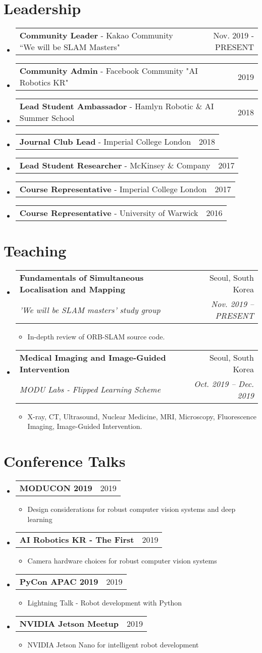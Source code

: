\documentclass[letterpaper,11pt]{article}
\makeatletter
\newcommand{\resumeItem}[1]{
  \item\small{
    {#1 \vspace{-2pt}}
  }
}
\newcommand{\resumeSubheading}[4]{
  \vspace{-1pt}\item
    \begin{tabular*}{0.97\textwidth}[t]{l@{\extracolsep{\fill}}r}
      \textbf{#1} & #2 \\
      \textit{\small#3} & \textit{\small #4} \\
    \end{tabular*}\vspace{-5pt}
}
\newcommand{\resumeTalk}[2]{
  \vspace{-1pt}\item
    \begin{tabular*}{0.97\textwidth}[t]{l@{\extracolsep{\fill}}r}
      \textbf{#1} & #2 \\
    \end{tabular*}\vspace{-5pt}
}
\newcommand{\resumeLeadership}[2]{
  \item
    \begin{tabular*}{0.97\textwidth}[t]{l@{\extracolsep{\fill}}r}
      #1 & #2
    \end{tabular*}
}
\newcommand{\resumeSubHeadingListStart}{\begin{itemize}[leftmargin=*]}
\newcommand{\resumeSubHeadingListEnd}{\end{itemize}}
\newcommand{\resumeItemListStart}{\begin{itemize}}
\newcommand{\resumeItemListEnd}{\end{itemize}\vspace{-5pt}}
\makeatother
\begin{document}

\section{Leadership}
  \resumeSubHeadingListStart
    \resumeLeadership{\textbf{Community Leader} - Kakao Community ``We will be SLAM Masters"}{Nov. 2019 - PRESENT}
    \resumeLeadership{\textbf{Community Admin} - Facebook Community "AI Robotics KR"}{2019}
    \resumeLeadership{\textbf{Lead Student Ambassador} - Hamlyn Robotic \& AI Summer School}{2018}
    \resumeLeadership{\textbf{Journal Club Lead} - Imperial College London}{2018}
    \resumeLeadership{\textbf{Lead Student Researcher} - McKinsey \& Company}{2017}
    \resumeLeadership{\textbf{Course Representative} - Imperial College London}{2017}
    \resumeLeadership{\textbf{Course Representative} - University of Warwick}{2016}
  \resumeSubHeadingListEnd

\section{Teaching}
    \resumeSubHeadingListStart
        \resumeSubheading{Fundamentals of Simultaneous Localisation and Mapping}{Seoul, South Korea}
        {'We will be SLAM masters' study group}{Nov. 2019 -- PRESENT}
            \resumeItemListStart
                \resumeItem{In-depth review of ORB-SLAM source code.}
            \resumeItemListEnd    
        \resumeSubheading{Medical Imaging and Image-Guided Intervention}{Seoul, South Korea}
        {MODU Labs - Flipped Learning Scheme}{Oct. 2019 -- Dec. 2019}
            \resumeItemListStart
                \resumeItem{X-ray, CT, Ultrasound, Nuclear Medicine, MRI, Microscopy, Fluorescence Imaging, Image-Guided Intervention.}
            \resumeItemListEnd
    \resumeSubHeadingListEnd

\section{Conference Talks}
    \resumeSubHeadingListStart
        \resumeTalk{MODUCON 2019}{2019}
            \resumeItemListStart
                \resumeItem{Design considerations for robust computer vision systems and deep learning}
            \resumeItemListEnd
        \resumeTalk{AI Robotics KR - The First}{2019}
            \resumeItemListStart
                \resumeItem{Camera hardware choices for robust computer vision systems}
            \resumeItemListEnd
        \resumeTalk{PyCon APAC 2019}{2019}
            \resumeItemListStart
                \resumeItem{Lightning Talk - Robot development with Python}
            \resumeItemListEnd
        \resumeTalk{NVIDIA Jetson Meetup}{2019}
            \resumeItemListStart
                \resumeItem{NVIDIA Jetson Nano for intelligent robot development}
            \resumeItemListEnd
    \resumeSubHeadingListEnd
\end{document}
